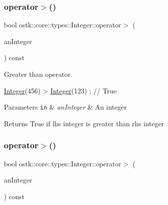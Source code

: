 \subsubsection{\texorpdfstring{operator$>$()}{operator>()}\hspace{0.1cm}{\footnotesize\ttfamily [1/2]}}
{\footnotesize\ttfamily bool ostk\+::core\+::types\+::\+Integer\+::operator$>$ (\begin{DoxyParamCaption}\item[{const \hyperlink{classostk_1_1core_1_1types_1_1_integer}{Integer} \&}]{an\+Integer }\end{DoxyParamCaption}) const}



Greater than operator. 


\begin{DoxyCode}
\hyperlink{classostk_1_1core_1_1types_1_1_integer_a209b939281106d4b590ad98fae291af9}{Integer}(456) > \hyperlink{classostk_1_1core_1_1types_1_1_integer_a209b939281106d4b590ad98fae291af9}{Integer}(123) ; \textcolor{comment}{// True}
\end{DoxyCode}



\begin{DoxyParams}[1]{Parameters}
\mbox{\tt in}  & {\em an\+Integer} & An integer \\
\hline
\end{DoxyParams}
\begin{DoxyReturn}{Returns}
True if lhs integer is greater than rhs integer 
\end{DoxyReturn}
\mbox{\label{classostk_1_1core_1_1types_1_1_integer_a2a3fdce6ecee0ce12df23a66bca1c640}} 
\subsubsection{\texorpdfstring{operator$>$()}{operator>()}\hspace{0.1cm}{\footnotesize\ttfamily [2/2]}}
{\footnotesize\ttfamily bool ostk\+::core\+::types\+::\+Integer\+::operator$>$ (\begin{DoxyParamCaption}\item[{const \hyperlink{classostk_1_1core_1_1types_1_1_integer_a76a5f41f78659f116eafaf26cecc3244}{Integer\+::\+Value\+Type} \&}]{an\+Integer }\end{DoxyParamCaption}) const}

